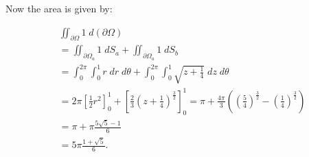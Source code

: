 \documentclass[11pt]{article}
\begin{document}
\begin{solution}
Now the area is given by:

\begin{align*}
        &
	\iint_{\partial\Omega} 1 \;d (\partial \Omega)
        \\&
        =	\iint_{\partial\Omega_a} 1 \;dS_a + 	\iint_{\partial\Omega_a} 1 \;dS_b
        \\&
        = \int_0^{2\pi} \int_0^1 r \;d r\;d\theta + \int_0^{2\pi} \int_0^1\sqrt{z+\frac{1}{4}}\;d z \;d \theta
        \\&
        = 2\pi\left[\frac{1}{2}r^2\right]_0^1 + \left[\frac{2}{3}(z+\frac{1}{4})^{\frac{3}{2}}\right]_0^1 = \pi + \frac{4\pi}{3}\left(\left(\frac{5}{4}\right)^{\frac{3}{2}} - \left(\frac{1}{4}\right)^{\frac{3}{2}}\right)
        \\&
        = \pi + \pi \frac{5\sqrt{5} - 1}{6}
        \\&
        = 5\pi \frac{1 + \sqrt{5}}{6}
        .
    \end{align*}
\end{solution}
\end{document}
